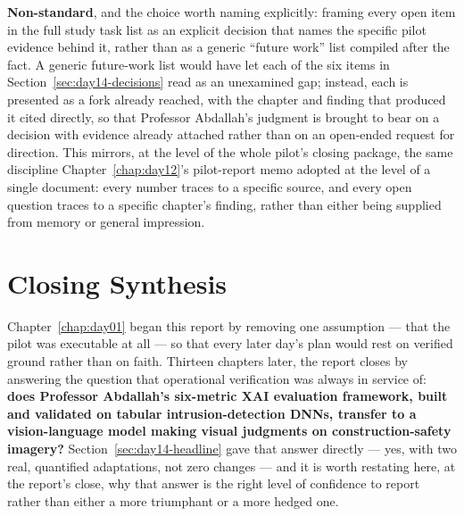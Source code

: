 \textbf{Non-standard}, and the choice worth naming explicitly: framing every open item in the
full study task list as an explicit decision that names the specific pilot evidence behind it,
rather than as a generic ``future work'' list compiled after the fact. A generic future-work
list would have let each of the six items in Section~\ref{sec:day14-decisions} read as an
unexamined gap; instead, each is presented as a fork already reached, with the chapter and
finding that produced it cited directly, so that Professor Abdallah's judgment is brought to
bear on a decision with evidence already attached rather than on an open-ended request for
direction. This mirrors, at the level of the whole pilot's closing package, the same discipline
Chapter~\ref{chap:day12}'s pilot-report memo adopted at the level of a single document: every
number traces to a specific source, and every open question traces to a specific chapter's
finding, rather than either being supplied from memory or general impression.

\section{Closing Synthesis}

Chapter~\ref{chap:day01} began this report by removing one assumption --- that the pilot was
executable at all --- so that every later day's plan would rest on verified ground rather than
on faith. Thirteen chapters later, the report closes by answering the question that operational
verification was always in service of: \textbf{does Professor Abdallah's six-metric XAI
evaluation framework, built and validated on tabular intrusion-detection DNNs, transfer to a
vision-language model making visual judgments on construction-safety imagery?} Section~\ref{sec:day14-headline}
gave that answer directly --- yes, with two real, quantified adaptations, not zero changes ---
and it is worth restating here, at the report's close, why that answer is the right level of
confidence to report rather than either a more triumphant or a more hedged one.

